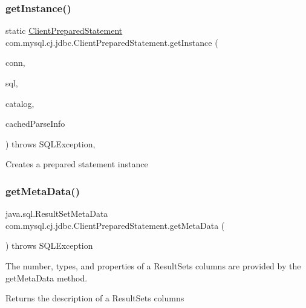 \subsubsection{\texorpdfstring{get\+Instance()}{getInstance()}\hspace{0.1cm}{\footnotesize\ttfamily [2/2]}}
{\footnotesize\ttfamily static \mbox{\hyperlink{classcom_1_1mysql_1_1cj_1_1jdbc_1_1_client_prepared_statement}{Client\+Prepared\+Statement}} com.\+mysql.\+cj.\+jdbc.\+Client\+Prepared\+Statement.\+get\+Instance (\begin{DoxyParamCaption}\item[{\mbox{\hyperlink{interfacecom_1_1mysql_1_1cj_1_1jdbc_1_1_jdbc_connection}{Jdbc\+Connection}}}]{conn,  }\item[{String}]{sql,  }\item[{String}]{catalog,  }\item[{\mbox{\hyperlink{classcom_1_1mysql_1_1cj_1_1_parse_info}{Parse\+Info}}}]{cached\+Parse\+Info }\end{DoxyParamCaption}) throws S\+Q\+L\+Exception\hspace{0.3cm}{\ttfamily [static]}, {\ttfamily [protected]}}

Creates a prepared statement instance \mbox{\label{classcom_1_1mysql_1_1cj_1_1jdbc_1_1_client_prepared_statement_ae1f37a264e7a4a58d3f57bed796b1b38}} 
\subsubsection{\texorpdfstring{get\+Meta\+Data()}{getMetaData()}}
{\footnotesize\ttfamily java.\+sql.\+Result\+Set\+Meta\+Data com.\+mysql.\+cj.\+jdbc.\+Client\+Prepared\+Statement.\+get\+Meta\+Data (\begin{DoxyParamCaption}{ }\end{DoxyParamCaption}) throws S\+Q\+L\+Exception}

The number, types, and properties of a Result\+Set\textquotesingle{}s columns are provided by the get\+Meta\+Data method.

\begin{DoxyReturn}{Returns}
the description of a Result\+Set\textquotesingle{}s columns
\end{DoxyReturn}

